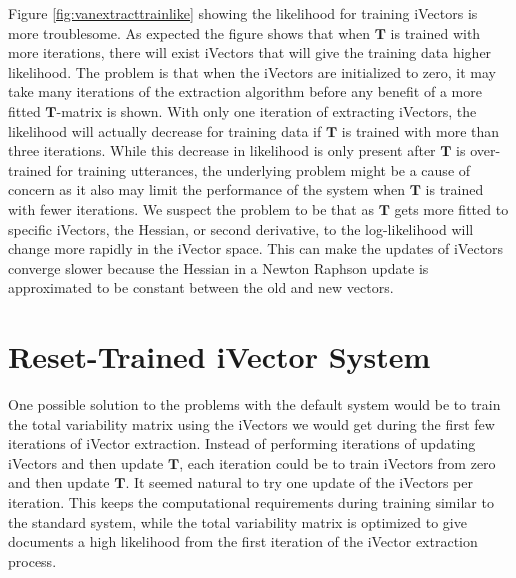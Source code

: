 Figure \ref{fig:vanextracttrainlike} showing the likelihood for training iVectors is more troublesome. As expected the figure shows that when $\mathbf{T}$ is trained with more iterations, there will exist iVectors that will give the training data higher likelihood. The problem is that when the iVectors are initialized to zero, it may take many iterations of the extraction algorithm before any benefit of a more fitted $\mathbf{T}$-matrix is shown. With only one iteration of extracting iVectors, the likelihood will actually decrease for training data if $\mathbf{T}$ is trained with more than three iterations. While this decrease in likelihood is only present after $\mathbf{T}$ is over-trained for training utterances, the underlying problem might be a cause of concern as it also may limit the performance of the system when $\mathbf{T}$ is trained with fewer iterations. We suspect the problem to be that as $\mathbf{T}$ gets more fitted to specific iVectors, the Hessian, or second derivative, to the log-likelihood will change more rapidly in the iVector space. This can make the updates of iVectors converge slower because the Hessian in a Newton Raphson update is approximated to be constant between the old and new vectors. 


\section{Reset-Trained iVector System}

One possible solution to the problems with the default system would be to train the total variability matrix using the iVectors we would get during the first few iterations of iVector extraction. Instead of performing iterations of updating iVectors and then update $\mathbf{T}$, each iteration could be to train iVectors from zero and then update $\mathbf{T}$. It seemed natural to try one update of the iVectors per iteration. This keeps the computational requirements during training similar to the standard system, while the total variability matrix is optimized to give documents a high likelihood from the first iteration of the iVector extraction process. 

